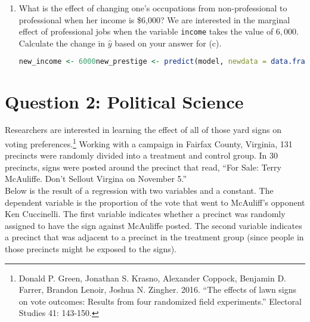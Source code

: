 \documentclass[12pt,letterpaper]{article}
\begin{document}
\begin{enumerate}
	\item [(g)]
	What is the effect of changing one's occupations from non-professional to professional when her income is \$6,000? We are interested in the marginal effect of professional jobs when the variable \texttt{income} takes the value of $6,000$. Calculate the change in $\hat{y}$ based on your answer for (c).
			\vspace{0.05cm}	
	\begin{lstlisting}[language=R]
		new_income <- 6000new_prestige <- predict(model, newdata = data.frame(income = new_income, professional = 1))old_prestige <- predict(model, newdata = data.frame(income = new_income, professional = 0))effect <- new_prestige - old_prestigeeffect
	\end{lstlisting}
	
\end{enumerate}

\section*{Question 2: Political Science}
\vspace{.25cm}
\noindent 	Researchers are interested in learning the effect of all of those yard signs on voting preferences.\footnote{Donald P. Green, Jonathan	S. Krasno, Alexander Coppock, Benjamin D. Farrer,	Brandon Lenoir, Joshua N. Zingher. 2016. ``The effects of lawn signs on vote outcomes: Results from four randomized field experiments.'' Electoral Studies 41: 143-150. } Working with a campaign in Fairfax County, Virginia, 131 precincts were randomly divided into a treatment and control group. In 30 precincts, signs were posted around the precinct that read, ``For Sale: Terry McAuliffe. Don't Sellout Virgina on November 5.'' \\

Below is the result of a regression with two variables and a constant.  The dependent variable is the proportion of the vote that went to McAuliff's opponent Ken Cuccinelli. The first variable indicates whether a precinct was randomly assigned to have the sign against McAuliffe posted. The second variable indicates
a precinct that was adjacent to a precinct in the treatment group (since people in those precincts might be exposed to the signs).  \\
\end{document}
